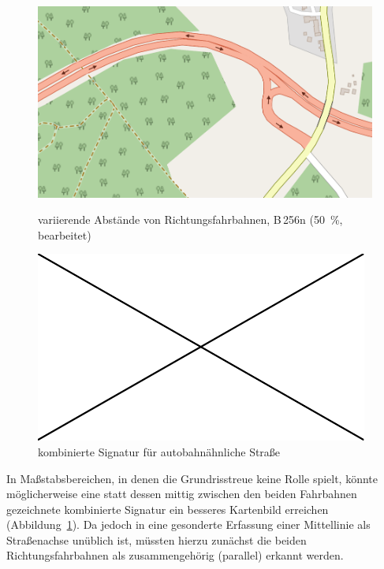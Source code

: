 \documentclass[../main/thesis.tex]{subfiles}
\begin{document}
\begin{figure}[ht]
  \begin{minipage}{.5\linewidth}
    \centering
    \includegraphics[width=\ScaleIfNeeded]{../chapter2/b256@2-z16}
    \caption{variierende Abstände von Richtungsfahrbahnen, B\,256n (50~\%, bearbeitet)}\label{fig:b256}
  \end{minipage}%
  \begin{minipage}{.5\linewidth}
    \centering
    \includegraphics[width=\ScaleIfNeeded]{../image-missing}
    \caption{kombinierte Signatur für autobahnähnliche Straße}\label{fig:dual-carriageway}
  \end{minipage}
\end{figure}

In Maßstabsbereichen, in denen die Grundrisstreue keine Rolle spielt, könnte möglicherweise eine statt dessen mittig zwischen den beiden Fahrbahnen gezeichnete kombinierte Signatur ein besseres Kartenbild erreichen (Abbildung~\ref{fig:dual-carriageway}). Da jedoch in \osm{} eine gesonderte Erfassung einer Mittellinie als Straßenachse unüblich ist, müssten hierzu zunächst die beiden Richtungsfahrbahnen als zusammengehörig (parallel) erkannt werden.
\end{document}
